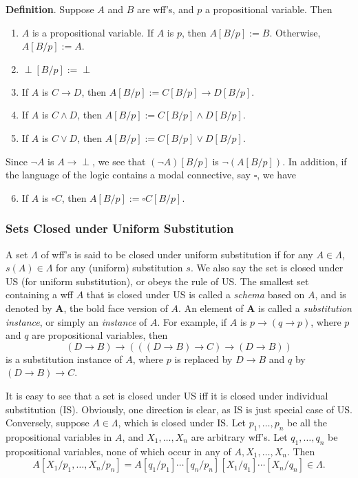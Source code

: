 \documentclass[12pt]{article}
\begin{document}
\textbf{Definition}.  Suppose $A$ and $B$ are wff's, and $p$ a propositional variable.  Then
\begin{enumerate}
\item $A$ is a propositional variable.  If $A$ is $p$, then $A[B/p]:=B$.  Otherwise, $A[B/p]:=A$.
\item $\perp[B/p]:=\perp$
\item If $A$ is $C\to D$, then $A[B/p]:=C[B/p]\to D[B/p]$.
\item If $A$ is $C\land D$, then $A[B/p]:=C[B/p]\land D[B/p]$.
\item If $A$ is $C\lor D$, then $A[B/p]:=C[B/p]\lor D[B/p]$.
\end{enumerate}
Since $\neg A$ is $A\to \perp$, we see that $(\neg A)[B/p]$ is $\neg (A[B/p])$.  In addition, if the language of the logic contains a modal connective, say $\square$, we have
\begin{enumerate}
\setcounter{enumi}{5}
\item If $A$ is $\square C$, then $A[B/p]:=\square C[B/p]$.
\end{enumerate}

\subsubsection*{Sets Closed under Uniform Substitution}
A set $\Lambda$ of wff's is said to be closed under uniform substitution if for any $A\in \Lambda$, $s(A)\in \Lambda$ for any (uniform) substitution $s$.  We also say the set is closed under US (for uniform substitution), or obeys the rule of US.  The smallest set containing a wff $A$ that is closed under US is called a \emph{schema} based on $A$, and is denoted by $\mathbf{A}$, the bold face version of $A$.  An element of $\mathbf{A}$ is called a \emph{substitution instance}, or simply an \emph{instance} of $A$.  For example, if $A$ is $p\to (q\to p)$, where $p$ and $q$ are propositional variables, then $$(D\to B)\to (((D\to B)\to C) \to (D\to B))$$ is a substitution instance of $A$, where $p$ is replaced by $D\to B$ and $q$ by $(D\to B)\to C$.

It is easy to see that a set is closed under US iff it is closed under individual substitution (IS).  Obviously, one direction is clear, as IS is just special case of US.  Conversely, suppose $A\in \Lambda$, which is closed under IS.  Let $p_1,\ldots,p_n$ be all the propositional variables in $A$, and $X_1,\ldots,X_n$ are arbitrary wff's.  Let $q_1,\ldots, q_n$ be propositional variables, none of which occur in any of $A, X_1,\ldots, X_n$.  Then
$$A[X_1/p_1,\ldots,X_n/p_n]=A[q_1/p_1]\cdots[q_n/p_n][X_1/q_1]\cdots [X_n/q_n] \in \Lambda.$$
\end{document}
